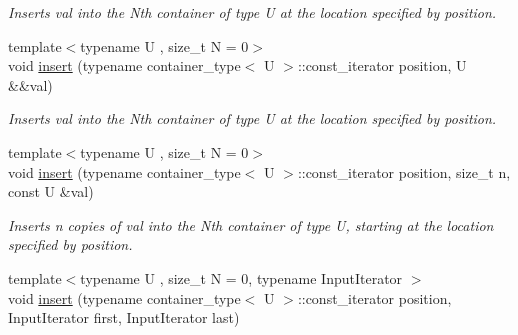\begin{DoxyCompactItemize}
\begin{DoxyCompactList}\small\item\em Inserts val into the Nth container of type U at the location specified by position. \end{DoxyCompactList}\item 
\hypertarget{classheterogeneous_1_1heterodeque_3_01_t_00_01_types_8_8_8_4_a8cb374c1401bb07b7d569fad007bf820}{}{\footnotesize template$<$typename U , size\+\_\+t N = 0$>$ }\\void \hyperlink{classheterogeneous_1_1heterodeque_3_01_t_00_01_types_8_8_8_4_a8cb374c1401bb07b7d569fad007bf820}{insert} (typename container\+\_\+type$<$ U $>$\+::const\+\_\+iterator position, U \&\&val)\label{classheterogeneous_1_1heterodeque_3_01_t_00_01_types_8_8_8_4_a8cb374c1401bb07b7d569fad007bf820}

\begin{DoxyCompactList}\small\item\em Inserts val into the Nth container of type U at the location specified by position. \end{DoxyCompactList}\item 
\hypertarget{classheterogeneous_1_1heterodeque_3_01_t_00_01_types_8_8_8_4_a3c60cb1f06d74f2baf34644d9d661b91}{}{\footnotesize template$<$typename U , size\+\_\+t N = 0$>$ }\\void \hyperlink{classheterogeneous_1_1heterodeque_3_01_t_00_01_types_8_8_8_4_a3c60cb1f06d74f2baf34644d9d661b91}{insert} (typename container\+\_\+type$<$ U $>$\+::const\+\_\+iterator position, size\+\_\+t n, const U \&val)\label{classheterogeneous_1_1heterodeque_3_01_t_00_01_types_8_8_8_4_a3c60cb1f06d74f2baf34644d9d661b91}

\begin{DoxyCompactList}\small\item\em Inserts n copies of val into the Nth container of type U, starting at the location specified by position. \end{DoxyCompactList}\item 
\hypertarget{classheterogeneous_1_1heterodeque_3_01_t_00_01_types_8_8_8_4_a192e7666d7c35ce643d6c9c89acd32fb}{}{\footnotesize template$<$typename U , size\+\_\+t N = 0, typename Input\+Iterator $>$ }\\void \hyperlink{classheterogeneous_1_1heterodeque_3_01_t_00_01_types_8_8_8_4_a192e7666d7c35ce643d6c9c89acd32fb}{insert} (typename container\+\_\+type$<$ U $>$\+::const\+\_\+iterator position, Input\+Iterator first, Input\+Iterator last)\label{classheterogeneous_1_1heterodeque_3_01_t_00_01_types_8_8_8_4_a192e7666d7c35ce643d6c9c89acd32fb}


\end{DoxyCompactItemize}
